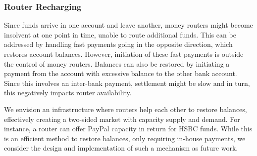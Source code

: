 \subsubsection*{Router Recharging}
Since funds arrive in one account and leave another, money routers might become insolvent at one point in time, unable to route additional funds.
This can be addressed by handling fast payments going in the opposite direction, which restores account balances.
However, initiation of these fast payments is outside the control of money routers.
Balances can also be restored by initiating a payment from the account with excessive balance to the other bank account.
Since this involves an inter-bank payment, settlement might be slow and in turn, this negatively impacts router availability.

We envision an infrastructure where routers help each other to restore balances, effectively creating a two-sided market with capacity supply and demand.
For instance, a router can offer PayPal capacity in return for HSBC funds.
While this is an efficient method to restore balances, only requiring in-house payments, we consider the design and implementation of such a mechanism as future work.


\label{sec:switch_validation}

